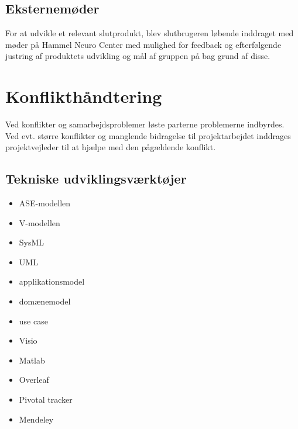 \section{Eksternemøder}
For at udvikle et relevant slutprodukt, blev slutbrugeren løbende inddraget med møder på Hammel Neuro Center med mulighed for feedback og efterfølgende justring af produktets udvikling og mål af gruppen på bag grund af disse. 


\chapter{Konflikthåndtering}
Ved konflikter og samarbejdsproblemer løste parterne problemerne indbyrdes. Ved evt. større konflikter og manglende bidragelse til projektarbejdet inddrages projektvejleder til at hjælpe med den pågældende konflikt. 






































\section*{Tekniske udviklingsværktøjer}
\begin{itemize}
\item ASE-modellen
\item V-modellen
\item SysML
\item UML
\item applikationsmodel
\item domænemodel
\item use case
\item Visio
\item Matlab
\item Overleaf
\item Pivotal tracker
\item Mendeley
\end{itemize}






